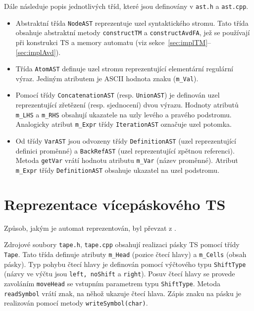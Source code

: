 \documentclass[thesis=B,czech]{FITthesis}[2019/12/23]
\theoremstyle{definition}
\begin{document}
Dále následuje popis jednotlivých tříd, které jsou definovány v  \texttt{ast.h} a \texttt{ast.cpp}.
\begin{itemize}
	\item{Abstraktní třída \texttt{NodeAST} reprezentuje uzel syntaktického stromu. Tato třída obsahuje abstraktní metody \texttt{constructTM} a \texttt{constructAvdFA}, jež se používají při konstrukci TS a memory automatu (viz sekce~\ref{sec:implTM}--\ref{sec:implAvd}).} 
	\item{Třída \texttt{AtomAST} definuje uzel stromu reprezentující elementární regulární výraz. Jediným atributem je ASCII hodnota znaku (\texttt{m\_Val}).}  
	\item{Pomocí třídy \texttt{ConcatenationAST} (resp. \texttt{UnionAST}) je definován uzel reprezentující zřetězení (resp. sjednocení) dvou výrazu. Hodnoty atributů \texttt{m\_LHS} a \texttt{m\_RHS} obsahují ukazatele na uzly levého a pravého podstromu. Analogicky atribut \texttt{m\_Expr} třídy \texttt{IterationAST} označuje uzel potomka.}
	\item{Od třídy \texttt{VarAST} jsou odvozeny třídy \texttt{DefinitionAST} (uzel reprezentující definici proměnné) a \texttt{BackRefAST} (uzel reprezentující zpětnou referenci). Metoda \texttt{getVar} vrátí hodnotu atributu \texttt{m\_Var} (název proměnné). Atribut \texttt{m\_Expr} třídy \texttt{DefinitionAST} obsahuje ukazatel na uzel podstromu.}
\end{itemize}

\section{Reprezentace vícepáskového TS}
Způsob, jakým je automat reprezentován, byl převzat z \cite{ndtmsim}. 

Zdrojové soubory \texttt{tape.h}, \texttt{tape.cpp} obsahují realizaci pásky TS pomocí třídy \texttt{Tape}. Tato třída definuje atributy \texttt{m\_Head} (pozice čtecí hlavy) a \texttt{m\_Cells} (obsah pásky). Typ pohybu čtecí hlavy je definován pomocí výčtového typu \texttt{ShiftType} (názvy ve výčtu jsou \texttt{left, noShift} a \texttt{right}). Posuv čtecí hlavy se provede zavoláním \texttt{moveHead} se vstupním parametrem typu \texttt{ShiftType}. Metoda \texttt{readSymbol} vrátí znak, na něhož ukazuje čtecí hlava. Zápis znaku na pásku je realizován pomocí metody \texttt{writeSymbol(char)}. 
\end{document}
